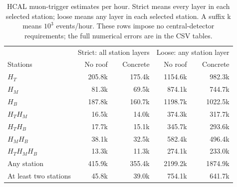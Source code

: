 \begin{table}[htbp]
\centering\small
\caption{HCAL muon-trigger estimates per hour. Strict means every layer in each selected station; loose means any layer in each selected station. A suffix k means $10^3$ events/hour. These rows impose no central-detector requirements; the full numerical errors are in the CSV tables.}\label{tab:hcal}
\begin{tabular}{lrrrr}
\toprule
 & \multicolumn{2}{c}{Strict: all station layers} & \multicolumn{2}{c}{Loose: any station layer}\\Stations & No roof & Concrete & No roof & Concrete\\
\midrule
$H_T$ & 205.8k & 175.4k & 1154.6k & 982.3k\\
$H_M$ & 81.3k & 69.5k & 874.1k & 744.7k\\
$H_B$ & 187.8k & 160.7k & 1198.7k & 1022.5k\\
$H_TH_M$ & 16.5k & 14.0k & 374.3k & 317.7k\\
$H_TH_B$ & 17.7k & 15.1k & 345.7k & 293.6k\\
$H_MH_B$ & 38.1k & 32.5k & 582.4k & 496.4k\\
$H_TH_MH_B$ & 13.3k & 11.3k & 274.1k & 233.0k\\
\midrule
Any station & 415.9k & 355.4k & 2199.2k & 1874.9k\\
At least two stations & 45.8k & 39.0k & 754.1k & 641.7k\\
\bottomrule
\end{tabular}
\end{table}
